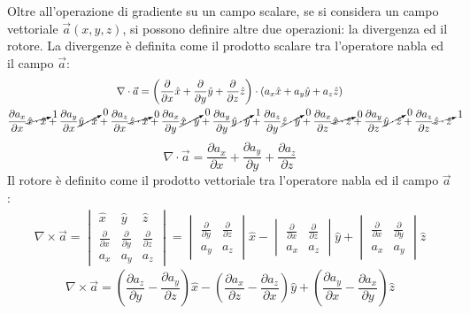 \documentclass{article}
\numberwithin{equation}{subsection}
\begin{document}
Oltre all'operazione di gradiente su un campo scalare, se si considera un campo vettoriale $\vec{a}(x,y,z)$, si possono definire altre due operazioni: la divergenza ed il 
rotore. La divergenze è definita come il prodotto scalare tra l'operatore nabla ed il campo $\vec{a}$:
\begin{gather*}
    {\nabla}\cdot\vec{a}=\displaystyle\left(\frac{\partial}{\partial x}\hat{x}+\frac{\partial}{\partial y}\hat{y}+\frac{\partial}{\partial z}\hat z\right)\cdot\left(a_x\hat{x}+a_y\hat{y}+a_z\hat{z}\right)\\
    \displaystyle\frac{\partial a_x}{\partial x}\cancelto{1}{\hat{x}\cdot\hat{x}}+\frac{\partial a_y}{\partial x}\cancelto{0}{\hat{y}\cdot\hat{x}}+\frac{\partial a_z}{\partial x}\cancelto{0}{\hat{z}\cdot\hat{x}}+
    \frac{\partial a_x}{\partial y}\cancelto{0}{\hat{x}\cdot\hat{y}}+\frac{\partial a_y}{\partial y}\cancelto{1}{\hat{y}\cdot\hat{y}}+\frac{\partial a_z}{\partial y}\cancelto{0}{\hat{z}\cdot\hat{y}}+
    \frac{\partial a_x}{\partial z}\cancelto{0}{\hat{x}\cdot\hat{z}}+\frac{\partial a_y}{\partial z}\cancelto{0}{\hat{y}\cdot\hat{z}}+\frac{\partial a_z}{\partial z}\cancelto{1}{\hat{z}\cdot\hat{z}}
\end{gather*}
\begin{equation}
    {\nabla}\cdot\vec{a}=\displaystyle\frac{\partial a_x}{\partial x}+\frac{\partial a_y}{\partial y}+\frac{\partial a_z}{\partial z}
\end{equation}
Il rotore è definito come il prodotto vettoriale tra l'operatore nabla ed il campo $\vec{a}$:
\begin{gather*}
    {\nabla}\times\vec{a}=
    \begin{vmatrix}
        \hat{x} & \hat{y} & \hat{z} \\
        \displaystyle\frac{\partial}{\partial x} & \displaystyle\frac{\partial}{\partial y} & \displaystyle\frac{\partial}{\partial z}\\
        a_x & a_y & a_z
    \end{vmatrix}=
    \begin{vmatrix}
        \displaystyle\frac{\partial}{\partial y} & \displaystyle\frac{\partial }{\partial z}\\
        a_y & a_z
    \end{vmatrix}\hat{x}-
    \begin{vmatrix}
        \displaystyle\frac{\partial}{\partial x} & \displaystyle\frac{\partial}{\partial z}\\
        a_x & a_z
    \end{vmatrix}\hat{y}+
    \begin{vmatrix}
        \displaystyle\frac{\partial}{\partial x} & \displaystyle\frac{\partial}{\partial y}\\
        a_x & a_y
    \end{vmatrix}\hat{z}
\end{gather*}
\begin{equation}
    {\nabla}\times\vec{a}=\left(\displaystyle\frac{\partial a_z}{\partial y}-\frac{\partial a_y}{\partial z}\right)\hat{x}-\left(\frac{\partial a_x}{\partial z}-\frac{\partial a_z}{\partial x}\right)\hat{y}+\left(\frac{\partial a_y}{\partial x}-\frac{\partial a_x}{\partial y}\right)\hat{z}
\end{equation}
\end{document}
